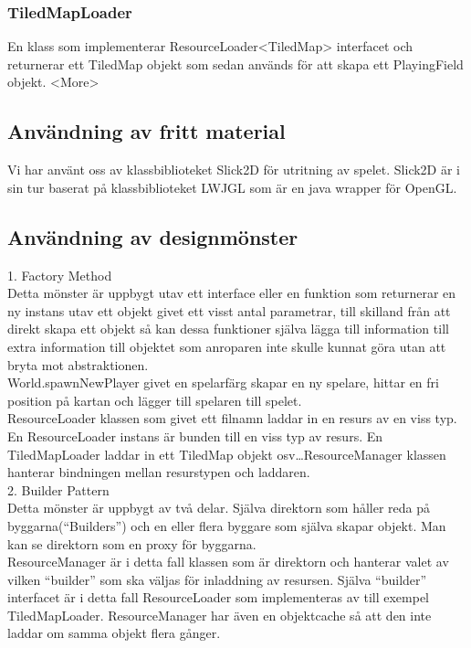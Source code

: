 \subsubsection{TiledMapLoader}
En klass som implementerar ResourceLoader<TiledMap> interfacet och returnerar ett TiledMap objekt som sedan används för att skapa ett PlayingField objekt. <More>\\
\subsection{Användning av fritt material}
Vi har använt oss av klassbiblioteket Slick2D för utritning av spelet. Slick2D är i sin tur baserat på klassbiblioteket LWJGL som är en java wrapper för OpenGL.
\subsection{Användning av designmönster}
1. Factory Method\\
Detta mönster är uppbygt utav ett interface eller en funktion som returnerar en ny instans utav ett objekt givet ett visst antal parametrar, till skilland från att direkt skapa ett objekt så kan dessa funktioner själva lägga till information till extra information till objektet som anroparen inte skulle kunnat göra utan att bryta mot abstraktionen.\\
World.spawnNewPlayer givet en spelarfärg skapar en ny spelare, hittar en fri position på kartan och lägger till spelaren till spelet.\\
ResourceLoader klassen som givet ett filnamn laddar in en resurs av en viss typ. En ResourceLoader instans är bunden till en viss typ av resurs. En TiledMapLoader laddar in ett TiledMap objekt osv\ldots ResourceManager klassen hanterar bindningen mellan resurstypen och laddaren.\\
\vspace{11pt}
2. Builder Pattern\\
Detta mönster är uppbygt av två delar. Själva direktorn som håller reda på byggarna(``Builders'') och en eller flera byggare som själva skapar objekt. Man kan se direktorn som en proxy för byggarna.\\
ResourceManager är i detta fall klassen som är direktorn och hanterar valet av vilken ``builder'' som ska väljas för inladdning av resursen. Själva ``builder'' interfacet är i detta fall ResourceLoader som implementeras av till exempel TiledMapLoader. ResourceManager har även en objektcache så att den inte laddar om samma objekt flera gånger.\\
